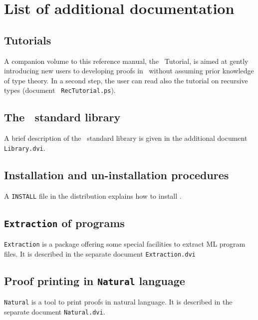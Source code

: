 \chapter[List of additional documentation]{List of additional documentation\label{Addoc}}

\section[Tutorials]{Tutorials\label{Tutorial}}
A companion volume to this reference manual, the \Coq\ Tutorial, is
aimed at gently introducing new users to developing proofs in \Coq\
without assuming prior knowledge of type theory. In a second step, the
user can read also the tutorial on recursive types (document {\tt
RecTutorial.ps}).

\section[The \Coq\ standard library]{The \Coq\ standard library\label{Addoc-library}}
A brief description of the \Coq\ standard library is given in the additional
document {\tt Library.dvi}.

\section[Installation and un-installation procedures]{Installation and un-installation procedures\label{Addoc-install}}
A \verb!INSTALL! file in the distribution explains how to install
\Coq.

\section[{\tt Extraction} of programs]{{\tt Extraction} of programs\label{Addoc-extract}}
{\tt Extraction} is a package offering some special facilities to
extract ML program files. It is described in the separate document
{\tt Extraction.dvi}

\section[Proof printing in {\tt Natural} language]{Proof printing in {\tt Natural} language\label{Addoc-natural}}
{\tt Natural} is a tool to print proofs in natural language.
It is described in the separate document {\tt Natural.dvi}.

